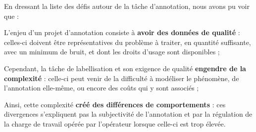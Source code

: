 	\begin{leftBarSummary}
		En dressant la liste des défis autour de la tâche d'annotation, nous avons pu voir que :
		\begin{todolist}
			\item[\itemok] L'enjeu d'un projet d'annotation consiste à \textbf{avoir des données de qualité} :
			celles-ci doivent être représentatives du problème à traiter, en quantité suffisante, avec un minimum de bruit, et dont les droits d'usage sont disponibles ;
			\item[\itemok] Cependant, la tâche de labellisation et son exigence de qualité \textbf{engendre de la complexité} :
			celle-ci peut venir de la difficulté à modéliser le phénomène, de l'annotation elle-même, ou encore des coûts qui y sont associés ;
			\item[\itemok] Ainsi, cette complexité \textbf{créé des différences de comportements} : ces divergences s'expliquent pas la subjectivité de l'annotation et par la régulation de la charge de travail opérée par l'opérateur lorsque celle-ci est trop élevée.
		\end{todolist}
	\end{leftBarSummary}